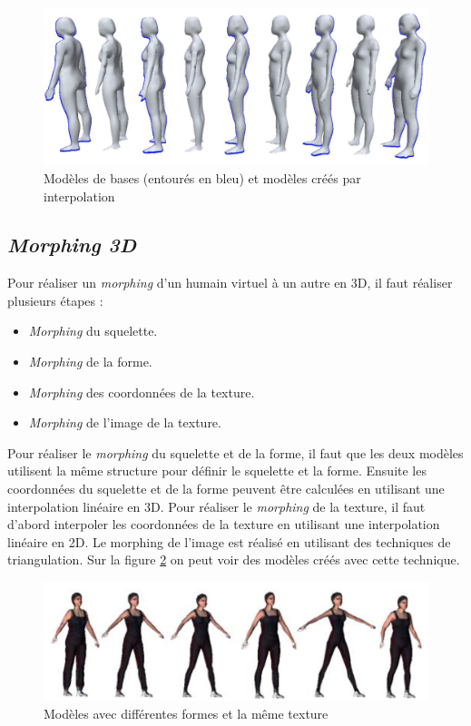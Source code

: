\begin{figure}[!h]
   	\centerline{\includegraphics[scale=0.4]{./shapeInterpolation2}}
   	\caption{\label{fig4} Modèles de bases (entourés en bleu) et modèles créés par interpolation \cite{zh09}}
\end{figure}
\subsection{\emph{Morphing 3D}}
Pour réaliser un \emph{morphing} d'un humain virtuel à un autre en 3D, il faut réaliser plusieurs étapes \cite{le01} :
\begin{itemize}
\item \emph{Morphing} du squelette.
\item \emph{Morphing} de la forme.
\item \emph{Morphing} des coordonnées de la texture.
\item \emph{Morphing} de l'image de la texture.
\end{itemize}
Pour réaliser le \emph{morphing} du squelette et de la forme, il faut que les deux modèles utilisent la même structure pour définir le squelette et la forme. Ensuite les coordonnées du squelette et de la forme peuvent être calculées en utilisant une interpolation linéaire en 3D.
Pour réaliser le \emph{morphing} de la texture, il faut d'abord interpoler les coordonnées de la texture en utilisant une interpolation linéaire en 2D. Le morphing de l'image est réalisé en utilisant des techniques de triangulation. Sur la figure \ref{fig8} on peut voir des modèles créés avec cette technique.
\begin{figure}[!h]
   	\centerline{\includegraphics[scale=0.4]{./morphing}}
   	\caption{\label{fig8} Modèles avec différentes formes et la même texture \cite{le01}}
\end{figure}
